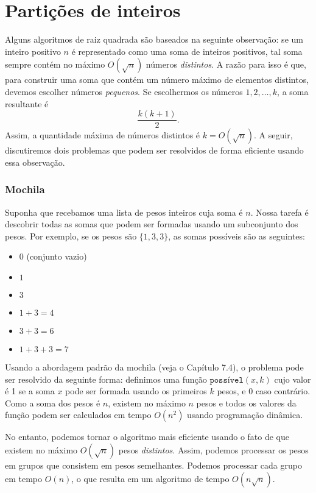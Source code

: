 \section{Partições de inteiros}

Alguns algoritmos de raiz quadrada são baseados na
seguinte observação:
se um inteiro positivo $n$ é representado como
uma soma de inteiros positivos,
tal soma sempre contém no máximo
$O(\sqrt n)$ números \emph{distintos}.
A razão para isso é que, para construir
uma soma que contém um número máximo de elementos distintos,
devemos escolher números \emph{pequenos}.
Se escolhermos os números $1,2,\ldots,k$,
a soma resultante é
\[\frac{k(k+1)}{2}.\]
Assim, a quantidade máxima de números distintos é $k = O(\sqrt n)$.
A seguir, discutiremos dois problemas que podem ser resolvidos
de forma eficiente usando essa observação.

\subsubsection{Mochila}

Suponha que recebamos uma lista de pesos inteiros
cuja soma é $n$.
Nossa tarefa é descobrir todas as somas que podem ser formadas usando
um subconjunto dos pesos. Por exemplo, se os pesos são
$\{1,3,3\}$, as somas possíveis são as seguintes:

\begin{itemize}[noitemsep]
\item $0$ (conjunto vazio)
\item $1$
\item $3$
\item $1+3=4$
\item $3+3=6$
\item $1+3+3=7$
\end{itemize}

Usando a abordagem padrão da mochila (veja o Capítulo 7.4),
o problema pode ser resolvido da seguinte forma:
definimos uma função $\texttt{possível}(x,k)$ cujo valor é 1
se a soma $x$ pode ser formada usando os primeiros $k$ pesos,
e 0 caso contrário.
Como a soma dos pesos é $n$,
existem no máximo $n$ pesos e
todos os valores da função podem ser calculados
em tempo $O(n^2)$ usando programação dinâmica.

No entanto, podemos tornar o algoritmo mais eficiente
usando o fato de que existem no máximo $O(\sqrt n)$
pesos \emph{distintos}.
Assim, podemos processar os pesos em grupos
que consistem em pesos semelhantes.
Podemos processar cada grupo
em tempo $O(n)$, o que resulta em um algoritmo de tempo $O(n \sqrt n)$.

